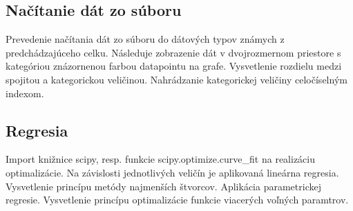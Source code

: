 \documentclass[12pt]{article}
\begin{document}
\subsection{Načítanie dát zo súboru}
Prevedenie načítania dát zo súboru do dátových typov známych z predchádzajúceho
celku. Následuje zobrazenie dát v dvojrozmernom priestore s kategóriou
znázornenou farbou datapointu na grafe. Vysvetlenie rozdielu medzi spojitou
a kategorickou veličinou. Nahrádzanie kategorickej veličiny celočíselným indexom.

\subsection{Regresia}
Import knižnice scipy, resp. funkcie scipy.optimize.curve\_fit na realizáciu
optimalizácie.
Na závislosti jednotlivých veličín je aplikovaná lineárna regresia. Vysvetlenie
princípu metódy najmenších štvorcov.
Aplikácia parametrickej regresie. Vysvetlenie princípu optimalizácie funkcie
viacerých voľných paramtrov.
\end{document}
